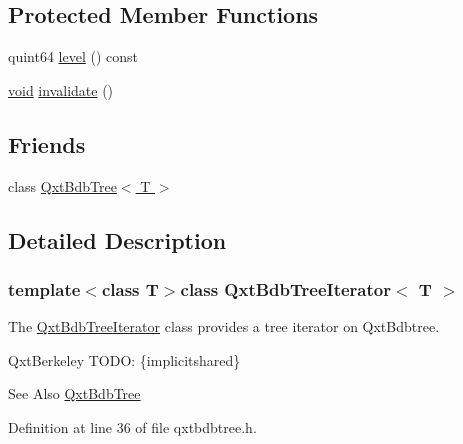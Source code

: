 \subsection*{Protected Member Functions}
\begin{DoxyCompactItemize}
\item 
quint64 \hyperlink{class_qxt_bdb_tree_iterator_ac8b1ff3e677e89059d2f70f20ab0144c}{level} () const 
\item 
\hyperlink{group___u_a_v_objects_plugin_ga444cf2ff3f0ecbe028adce838d373f5c}{void} \hyperlink{class_qxt_bdb_tree_iterator_a2893f329f4651ccf021ec05f47768321}{invalidate} ()
\end{DoxyCompactItemize}
\subsection*{Friends}
\begin{DoxyCompactItemize}
\item 
class \hyperlink{class_qxt_bdb_tree_iterator_a219e8c7d5d4a780ab2801235f58c0fd3}{Qxt\-Bdb\-Tree$<$ T $>$}
\end{DoxyCompactItemize}


\subsection{Detailed Description}
\subsubsection*{template$<$class T$>$class Qxt\-Bdb\-Tree\-Iterator$<$ T $>$}

The \hyperlink{class_qxt_bdb_tree_iterator}{Qxt\-Bdb\-Tree\-Iterator} class provides a tree iterator on Qxt\-Bdbtree. 

Qxt\-Berkeley T\-O\-D\-O\-: \{implicitshared\} \begin{DoxySeeAlso}{See Also}
\hyperlink{class_qxt_bdb_tree}{Qxt\-Bdb\-Tree} 
\end{DoxySeeAlso}


Definition at line 36 of file qxtbdbtree.\-h.



